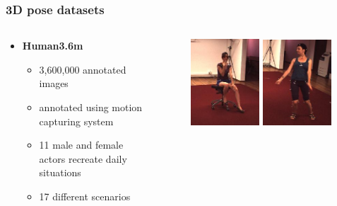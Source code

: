 \documentclass[9pt]{beamer}
\newenvironment{myframe}[1][]{%
\begin{frame}%
\frametitle{#1}
\setcounter{footnote}{0}


}{%
\end{frame}%
}
\begin{document}
\begin{myframe}[3D pose datasets]
  \begin{columns}[T]
      \begin{column}{.48\textwidth}
          \vspace{50px}
          \begin{itemize}
              \item \textbf{Human3.6m\footnotemark}
              \begin{itemize}
                  \item 3,600,000 annotated images
                  \item annotated using motion capturing system
                  \item 11 male and female actors recreate daily situations
                  \item 17 different scenarios
              \end{itemize}
          \end{itemize}
      \end{column}
      \begin{column}{.48\textwidth}
          \begin{figure}
              \includegraphics[width=0.48\textwidth]{human-01.jpg}
              \includegraphics[width=0.48\textwidth]{human-02.jpg}

\end{figure}
\end{column}
\end{columns}
\end{myframe}
\end{document}

